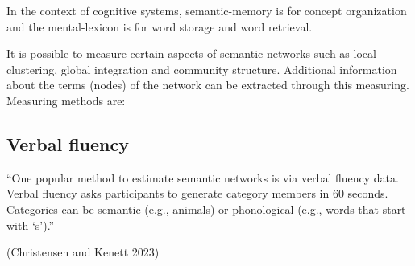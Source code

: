 In the context of cognitive systems, \gls{semantic-memory} is for concept organization and the \gls{mental-lexicon}
is for word storage and word retrieval.

It is possible to measure certain aspects of \glspl{semantic-network} such as local clustering, global integration
and community structure.
Additional information about the terms (nodes) of the network can be extracted through this measuring. Measuring
methods are:


\subsection*{Verbal fluency}
\begin{center}
    ``One popular method to estimate semantic networks is via verbal fluency data.
    Verbal fluency asks participants to generate category members in 60 seconds.
    Categories can be semantic (e.g., animals) or phonological (e.g., words that start with ‘s’).''
\end{center}
(Christensen and Kenett 2023)


